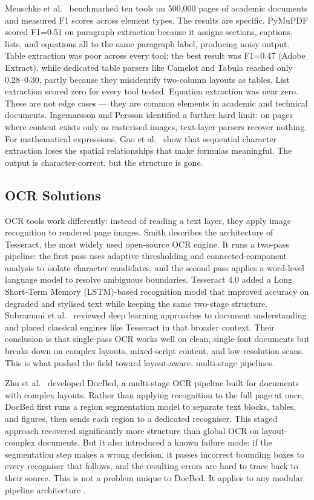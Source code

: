 Meuschke et al.\ \autocite{meuschke2023} benchmarked ten tools on 500,000 pages
of academic documents and measured F1 scores across element types. The results
are specific. PyMuPDF scored F1=0.51 on paragraph extraction because it assigns
sections, captions, lists, and equations all to the same paragraph label, producing
noisy output. Table extraction was poor across every tool: the best result was
F1=0.47 (Adobe Extract), while dedicated table parsers like Camelot and Tabula
reached only 0.28--0.30, partly because they misidentify two-column layouts as
tables. List extraction scored zero for every tool tested. Equation extraction
was near zero. These are not edge cases --- they are common elements in academic
and technical documents. Ingemarsson and Persson \autocite{ingemarsson2024}
identified a further hard limit: on pages where content exists only as rasterised
images, text-layer parsers recover nothing. For mathematical expressions, Gao
et al.\ \autocite{gao2011} show that sequential character extraction loses the
spatial relationships that make formulas meaningful. The output is
character-correct, but the structure is gone.

\subsection{OCR Solutions}

OCR tools work differently: instead of reading a text layer, they apply image
recognition to rendered page images. Smith \autocite{smith2007} describes the
architecture of Tesseract, the most widely used open-source OCR engine. It
runs a two-pass pipeline: the first pass uses adaptive thresholding and
connected-component analysis to isolate character candidates, and the second
pass applies a word-level language model to resolve ambiguous boundaries.
Tesseract 4.0 added a Long Short-Term Memory (LSTM)-based recognition model that improved accuracy on
degraded and stylised text while keeping the same two-stage structure.
Subramani et al.\ \autocite{subramani2020} reviewed deep learning approaches to
document understanding and placed classical engines like Tesseract in that
broader context. Their conclusion is that single-pass OCR works well on clean,
single-font documents but breaks down on complex layouts, mixed-script content,
and low-resolution scans. This is what pushed the field toward layout-aware,
multi-stage pipelines.

Zhu et al.\ \autocite{zhu2022} developed DocBed, a multi-stage OCR pipeline built
for documents with complex layouts. Rather than applying recognition to the
full page at once, DocBed first runs a region segmentation model to separate
text blocks, tables, and figures, then sends each region to a dedicated
recogniser. This staged approach recovered significantly more structure than
global OCR on layout-complex documents. But it also introduced a known failure
mode: if the segmentation step makes a wrong decision, it passes incorrect
bounding boxes to every recogniser that follows, and the resulting errors are
hard to trace back to their source. This is not a problem unique to DocBed.
It applies to any modular pipeline architecture \autocite{duan2025}.

